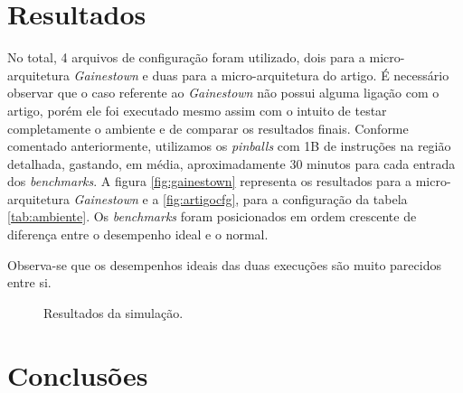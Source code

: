 \documentclass[12pt]{article}
\begin{document}
\section{Resultados}

No total, 4 arquivos de configuração foram utilizado, dois para a
micro-arquitetura \textit{Gainestown} e duas para a micro-arquitetura do artigo.
É necessário observar que o caso referente ao \textit{Gainestown} não possui
alguma ligação com o artigo, porém ele foi executado mesmo assim com o intuito
de testar completamente o ambiente e de comparar os resultados finais. Conforme
comentado anteriormente, utilizamos os \textit{pinballs} com 1B de instruções na
região detalhada, gastando, em média, aproximadamente 30 minutos para cada
entrada dos \textit{benchmarks}.  A figura \ref{fig:gainestown} representa os
resultados para a micro-arquitetura \textit{Gainestown} e a \ref{fig:artigocfg},
para a configuração da tabela \ref{tab:ambiente}. Os \textit{benchmarks} foram
posicionados em ordem crescente de diferença entre o desempenho ideal e o
normal.

Observa-se que os desempenhos ideais das duas execuções são muito parecidos
entre si.
 
\begin{figure}[ht]
  \centering
  
  
  \caption{Resultados da simulação.}
\end{figure} 
  


\section{Conclusões}






\end{document}
